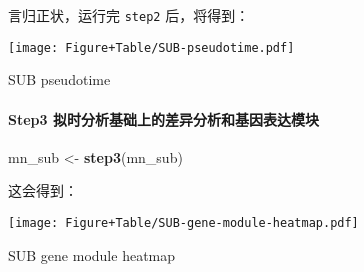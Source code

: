 \documentclass[
]{article}
\newenvironment{Shaded}{\begin{snugshade}}{\end{snugshade}}
\newcommand{\KeywordTok}[1]{\textcolor[rgb]{0.13,0.29,0.53}{\textbf{#1}}}
\newcommand{\NormalTok}[1]{#1}
\newcommand{\OperatorTok}[1]{\textcolor[rgb]{0.81,0.36,0.00}{\textbf{#1}}}
\newcommand{\StringTok}[1]{\textcolor[rgb]{0.31,0.60,0.02}{#1}}
\begin{document}
言归正状，运行完 \texttt{step2} 后，将得到：

\begin{Shaded}
\end{Shaded}

\def\@captype{figure}
\begin{center}
\texttt{[image: Figure+Table/SUB-pseudotime.pdf]}
\caption{SUB pseudotime}\label{fig:SUB-pseudotime}
\end{center}

\hypertarget{step3-ux62dfux65f6ux5206ux6790ux57faux7840ux4e0aux7684ux5deeux5f02ux5206ux6790ux548cux57faux56e0ux8868ux8fbeux6a21ux5757}{%
\paragraph{Step3 拟时分析基础上的差异分析和基因表达模块}\label{step3-ux62dfux65f6ux5206ux6790ux57faux7840ux4e0aux7684ux5deeux5f02ux5206ux6790ux548cux57faux56e0ux8868ux8fbeux6a21ux5757}}

\begin{Shaded}
\begin{Highlighting}[]
\NormalTok{mn\_sub \textless{}{-}}\StringTok{ }\KeywordTok{step3}\NormalTok{(mn\_sub)}
\end{Highlighting}
\end{Shaded}

这会得到：

\begin{Shaded}
\end{Shaded}

\def\@captype{figure}
\begin{center}
\texttt{[image: Figure+Table/SUB-gene-module-heatmap.pdf]}
\caption{SUB gene module heatmap}\label{fig:SUB-gene-module-heatmap}
\end{center}
\end{document}
